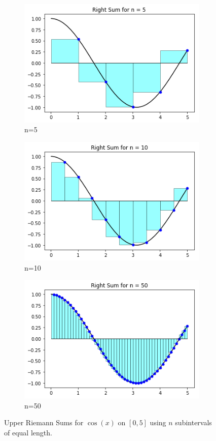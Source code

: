 \documentclass[12pt]{article}
\theoremstyle{definition}
\theoremstyle{plain}
\numberwithin{equation}{section}
\begin{document}
\begin{figure}
\centering
\begin{subfigure}{.33\textwidth}
  \includegraphics[width=0.9\linewidth]{RiemannSumN5.png}
  \caption{n=5}
\end{subfigure}%
\begin{subfigure}{.33\textwidth}
  \includegraphics[width=0.9\linewidth]{RiemannSumN10.png}
  \caption{n=10}
\end{subfigure}
\begin{subfigure}{.33\textwidth}
  \includegraphics[width=0.9\linewidth]{RiemannSumN50.png}
  \caption{n=50}
\end{subfigure}
\caption{Upper Riemann Sums for $\cos(x)$ on $[0,5]$ using $n$ subintervals of equal length.}
\label{fig:RiemannSumIncresN}
\end{figure}
\end{document}
